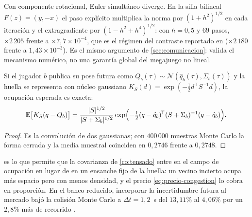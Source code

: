 \begin{observacion}
\label{obs:extragradiente-silla}
Con componente rotacional, Euler simultáneo diverge. En la silla bilineal
$F(z)=(y,-x)$ el paso explícito multiplica la norma por $(1+h^2)^{1/2}$ en
cada iteración y el extragradiente por $(1-h^2+h^4)^{1/2}$: con $h=0{,}5$ y
$69$ pasos, $\times2\,205$ frente a $\times7{,}7\times10^{-4}$, que es el
régimen del contraste reportado en \cite{mayorga2026compendio}
($\times2\,180$ frente a $1{,}43\times10^{-3}$). Es el mismo argumento de
\cref{sec:comunicacion}: valida el mecanismo numérico, no una garantía global
del megajuego no lineal.
\end{observacion}

\begin{proposicion}
\label{pr:convolucion-intencion}
Si el jugador $b$ publica su pose futura como $Q_b(\tau)\sim\mathcal N(\hat
q_b(\tau),\Sigma_b(\tau))$ y la huella se representa con núcleo gaussiano
$K_S(d)=\exp(-\tfrac12d^{\!\top}S^{-1}d)$, la ocupación esperada es exacta:
\begin{equation}
  \label{eq:convolucion}
  \mathbb E\bigl[K_S(q-Q_b)\bigr]=\frac{|S|^{1/2}}{|S+\Sigma_b|^{1/2}}
  \exp\Bigl(-\tfrac12(q-\hat q_b)^{\!\top}(S+\Sigma_b)^{-1}(q-\hat q_b)\Bigr).
\end{equation}
\end{proposicion}

\begin{proof}
Es la convolución de dos gaussianas; con $400\,000$ muestras Monte Carlo la
forma cerrada y la media muestral coinciden en $0{,}2746$ frente a $0{,}2748$.
\end{proof}

\begin{observacion}
\label{obs:convolucion-uso}
 es lo que permite que la covarianza de
\cref{co:tensado} entre en el campo de ocupación en lugar de en un ensanche
fijo de la huella: un vecino incierto ocupa más espacio pero con menos
densidad, y el precio \eqref{eq:precio-congestion} lo cobra en proporción. En
el banco reducido, incorporar la incertidumbre futura al mercado bajó la
colisión Monte Carlo a $\Delta t=1{,}2$~s del $13{,}11\%$ al $4{,}06\%$ por un
$2{,}8\%$ más de recorrido \cite{mayorga2026compendio}.
\end{observacion}

